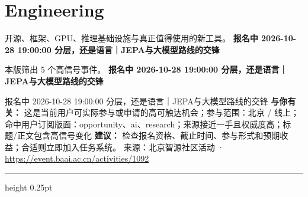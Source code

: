 \documentclass[10.5pt]{ctexart}
\begin{document}
\section*{Engineering}
{\color{ormuted} 开源、框架、GPU、推理基础设施与真正值得使用的新工具。}
\vspace{2mm}
{\LARGE\bfseries 报名中 2026-10-28 19:00:00 分层，还是语言｜JEPA与大模型路线的交锋}\par
\vspace{1mm}
{\color{ormuted} 本版筛出 5 个高信号事件。}
\vspace{3mm}
{\Large\bfseries 报名中 2026-10-28 19:00:00 分层，还是语言｜JEPA与大模型路线的交锋}\par
报名中 2026-10-28 19:00:00 分层，还是语言｜JEPA与大模型路线的交锋
\textbf{与你有关：} 这是当前用户可实际参与或申请的高可触达机会；参与范围：北京 / 线上；命中用户订阅版面：opportunity、ai、research；来源接近一手且权威度高；标题/正文包含高信号变化
\textbf{建议：} 检查报名资格、截止时间、参与形式和预期收益；合适则立即加入任务系统。
{\footnotesize\color{ormuted} 来源：北京智源社区活动 · \url{https://event.baai.ac.cn/activities/1092}}
\vspace{4mm}
\hrule height 0.25pt
\vspace{3mm}
\end{document}
